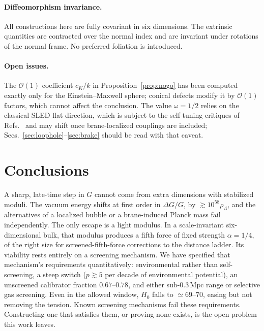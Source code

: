\documentclass[aps,prd,reprint,superscriptaddress,nofootinbib,floatfix]{revtex4-2}
\theoremstyle{definition}
\newcommand{\Mpc}{\,\mathrm{Mpc}}
\begin{document}
\paragraph*{Diffeomorphism invariance.} All constructions here are fully covariant in six dimensions. The extrinsic quantities are contracted over the normal index and are invariant under rotations of the normal frame. No preferred foliation is introduced.

\paragraph*{Open issues.} The $\mathcal{O}(1)$ coefficient $c_K/k$ in Proposition~\ref{prop:nogo} has been computed exactly only for the Einstein--Maxwell sphere; conical defects modify it by $\mathcal{O}(1)$ factors, which cannot affect the conclusion. The value $\omega=1/2$ relies on the classical SLED flat direction, which is subject to the self-tuning critiques of Refs.~\cite{GarrigaPorrati2004,ABPQ2004} and may shift once brane-localized couplings are included; Secs.~\ref{sec:loophole}--\ref{sec:brake} should be read with that caveat.

\section{Conclusions}

A sharp, late-time step in $G$ cannot come from extra dimensions with stabilized moduli. The vacuum energy shifts at first order in $\Delta G/G$, by $\gtrsim10^{58}\rho_\Lambda$, and the alternatives of a localized bubble or a brane-induced Planck mass fail independently. The only escape is a light modulus. In a scale-invariant six-dimensional bulk, that modulus produces a fifth force of fixed strength $\alpha=1/4$, of the right size for screened-fifth-force corrections to the distance ladder. Its viability rests entirely on a screening mechanism. We have specified that mechanism's requirements quantitatively: environmental rather than self-screening, a steep switch ($p\gtrsim5$ per decade of environmental potential), an unscreened calibrator fraction $0.67$--$0.78$, and either sub-$0.3\Mpc$ range or selective gas screening. Even in the allowed window, $H_0$ falls to $\simeq69$--$70$, easing but not removing the tension. Known screening mechanisms fail these requirements. Constructing one that satisfies them, or proving none exists, is the open problem this work leaves.
\end{document}
